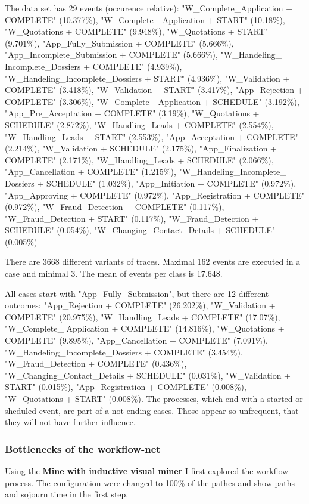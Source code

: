 The data set has 29 events (occurence relative): 
"W\_Complete\_Application + COMPLETE" (10.377\%), "W\_Complete\_ Application + START" (10.18\%), "W\_Quotations + COMPLETE" (9.948\%), "W\_Quotations + START" (9.701\%), "App\_Fully\_Submission + COMPLETE" (5.666\%), "App\_Incomplete\_Submission + COMPLETE" (5.666\%), "W\_Handeling\_ Incomplete\_Dossiers + COMPLETE" (4.939\%), "W\_Handeling\_Incomplete\_Dossiers + START" (4.936\%), "W\_Validation + COMPLETE" (3.418\%), "W\_Validation + START" (3.417\%), "App\_Rejection + COMPLETE" (3.306\%), "W\_Complete\_ Application + SCHEDULE" (3.192\%), "App\_Pre\_Acceptation + COMPLETE" (3.19\%), "W\_Quotations + SCHEDULE" (2.872\%), "W\_Handling\_Leads + COMPLETE" (2.554\%), "W\_Handling\_Leads + START" (2.553\%), "App\_Acceptation + COMPLETE" (2.214\%), "W\_Validation + SCHEDULE" (2.175\%), "App\_Finalization + COMPLETE" (2.171\%), "W\_Handling\_Leads + SCHEDULE" (2.066\%), "App\_Cancellation + COMPLETE" (1.215\%), "W\_Handeling\_Incomplete\_ Dossiers + SCHEDULE" (1.032\%), "App\_Initiation + COMPLETE" (0.972\%), "App\_Approving + COMPLETE" (0.972\%), "App\_Registration + COMPLETE" (0.972\%), "W\_Fraud\_Detection + COMPLETE" (0.117\%), "W\_Fraud\_Detection + START" (0.117\%), "W\_Fraud\_Detection + SCHEDULE" (0.054\%), "W\_Changing\_Contact\_Details + SCHEDULE" (0.005\%)

There are 3668 different variants of traces. Maximal 162 events are executed in a case and minimal 3. The mean of events per class is 17.648.

All cases start with "App\_Fully\_Submission", but there are 12 different outcomes: 
"App\_Rejection + COMPLETE" (26.202\%), "W\_Validation + COMPLETE" (20.975\%), "W\_Handling\_Leads + COMPLETE" (17.07\%), "W\_Complete\_ Application + COMPLETE" (14.816\%), "W\_Quotations + COMPLETE" (9.895\%), "App\_Cancellation + COMPLETE" (7.091\%), "W\_Handeling\_Incomplete\_Dossiers + COMPLETE" (3.454\%), "W\_Fraud\_Detection + COMPLETE" (0.436\%), "W\_Changing\_Contact\_Details + SCHEDULE" (0.031\%), "W\_Validation + START" (0.015\%), "App\_Registration + COMPLETE" (0.008\%), "W\_Quotations + START" (0.008\%). The processes, which end with a started or sheduled event, are part of a not ending cases. Those appear so unfrequent, that they will not have further influence.


\subsubsection{Bottlenecks of the workflow-net}
Using the \textbf{Mine with inductive visual miner} I first explored the workflow process. The configuration were changed to 100\% of the pathes and show paths and sojourn time in the first step.

